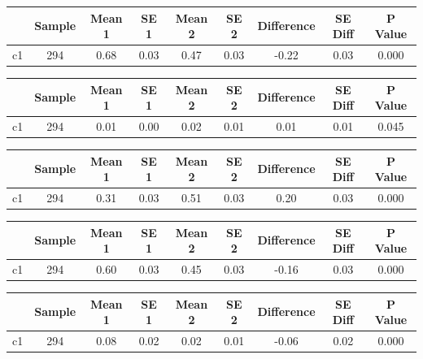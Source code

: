 {
\def\sym#1{\ifmmode^{#1}\else\(^{#1}\)\fi}
\begin{tabular}{l*{1}{cccccccc}}
\hline\hline
            &      Sample&      Mean 1&        SE 1&      Mean 2&        SE 2&  Difference&     SE Diff&     P Value\\
\hline
c1          &         294&        0.68&        0.03&        0.47&        0.03&       -0.22&        0.03&       0.000\\
\hline\hline
\end{tabular}
}
{
\def\sym#1{\ifmmode^{#1}\else\(^{#1}\)\fi}
\begin{tabular}{l*{1}{cccccccc}}
\hline\hline
            &      Sample&      Mean 1&        SE 1&      Mean 2&        SE 2&  Difference&     SE Diff&     P Value\\
\hline
c1          &         294&        0.01&        0.00&        0.02&        0.01&        0.01&        0.01&       0.045\\
\hline\hline
\end{tabular}
}
{
\def\sym#1{\ifmmode^{#1}\else\(^{#1}\)\fi}
\begin{tabular}{l*{1}{cccccccc}}
\hline\hline
            &      Sample&      Mean 1&        SE 1&      Mean 2&        SE 2&  Difference&     SE Diff&     P Value\\
\hline
c1          &         294&        0.31&        0.03&        0.51&        0.03&        0.20&        0.03&       0.000\\
\hline\hline
\end{tabular}
}
{
\def\sym#1{\ifmmode^{#1}\else\(^{#1}\)\fi}
\begin{tabular}{l*{1}{cccccccc}}
\hline\hline
            &      Sample&      Mean 1&        SE 1&      Mean 2&        SE 2&  Difference&     SE Diff&     P Value\\
\hline
c1          &         294&        0.60&        0.03&        0.45&        0.03&       -0.16&        0.03&       0.000\\
\hline\hline
\end{tabular}
}
{
\def\sym#1{\ifmmode^{#1}\else\(^{#1}\)\fi}
\begin{tabular}{l*{1}{cccccccc}}
\hline\hline
            &      Sample&      Mean 1&        SE 1&      Mean 2&        SE 2&  Difference&     SE Diff&     P Value\\
\hline
c1          &         294&        0.08&        0.02&        0.02&        0.01&       -0.06&        0.02&       0.000\\
\hline\hline
\end{tabular}
}
